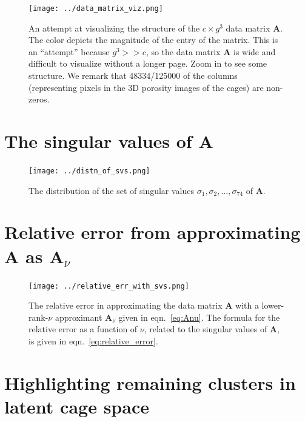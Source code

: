 \documentclass[journal=jacsat,manuscript=article]{achemso}
\begin{document}
\begin{figure}
\centering
	\texttt{[image: ../data\_matrix\_viz.png]}
	\caption{An attempt at visualizing the structure of the $c \times g^3$ data matrix $\mathbf{A}$. The color depicts the magnitude of the entry of the matrix. This is an ``attempt'' because $g^3>>c$, so the data matrix $\mathbf{A}$ is wide and difficult to visualize without a longer page. Zoom in to see some structure. We remark that 48334/125000 of the columns (representing pixels in the 3D porosity images of the cages) are non-zeros.
	} \label{fig:data_matrix}
\end{figure}

\newpage
\clearpage

\section{The singular values of $\mathbf{A}$}

\begin{figure}
\centering
	\texttt{[image: ../distn\_of\_svs.png]}
	\caption{The distribution of the set of singular values $\sigma_1,\sigma_2, ..., \sigma_{74}$ of $\mathbf{A}$.
	} \label{fig:distn_of_svs}
\end{figure}

\newpage
\clearpage

\section{Relative error from approximating $\mathbf{A}$ as $\mathbf{A}_\nu$}

\begin{figure}
\centering
	\texttt{[image: ../relative\_err\_with\_svs.png]}
	\caption{The relative error in approximating the data matrix $\mathbf{A}$ with a lower-rank-$\nu$ approximant $\mathbf{A}_\nu$ given in eqn.~\ref{eq:Anu}. The formula for the relative error as a function of $\nu$, related to the singular values of $\mathbf{A}$, is given in eqn.~\ref{eq:relative_error}.
	} \label{fig:relative_err_with_svs}
\end{figure}

\newpage
\clearpage

\section{Highlighting remaining clusters in latent cage space}
\end{document}
